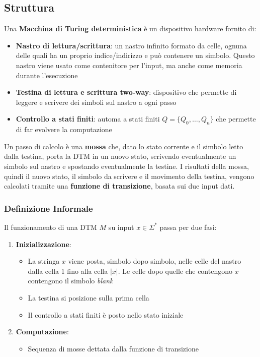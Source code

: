 \subsection{Struttura}

Una \textbf{Macchina di Turing deterministica} è un dispositivo hardware fornito di:
\begin{itemize}
	\item \textbf{Nastro di lettura/scrittura}: un nastro infinito formato da celle, ognuna delle quali ha un proprio indice/indirizzo e può contenere un simbolo. Questo nastro viene usato come contenitore per l'input, ma anche come memoria durante l'esecuzione
    
	\item \textbf{Testina di lettura e scrittura two-way}: dispositivo che permette di leggere e scrivere dei simboli sul nastro a ogni passo
    
	\item \textbf{Controllo a stati finiti}: automa a stati finiti $Q = \{Q_0, \dots, Q_n\}$ che permette di far evolvere la computazione
\end{itemize}

Un passo di calcolo è una \textbf{mossa} che, dato lo stato corrente e il simbolo letto dalla testina, porta la DTM in un nuovo stato, scrivendo eventualmente un simbolo sul nastro e spostando eventualmente la testine. I risultati della mossa, quindi il nuovo stato, il simbolo da scrivere e il movimento della testina, vengono calcolati tramite una \textbf{funzione di transizione}, basata sui due input dati.

\subsubsection{Definizione Informale}

Il funzionamento di una DTM $M$ su input $x \in \Sigma^\ast$ passa per due fasi:
\begin{enumerate}
	\item \textbf{Inizializzazione}:
	\begin{itemize}
		\item La stringa $x$ viene posta, simbolo dopo simbolo, nelle celle del nastro dalla cella 1 fino alla cella $|x|$. Le celle dopo quelle che contengono $x$ contengono il simbolo \textit{blank}
		
        \item La testina si posizione sulla prima cella
		
        \item Il controllo a stati finiti è posto nello stato iniziale
	\end{itemize}
	
    \item \textbf{Computazione}:
	\begin{itemize}
		\item Sequenza di mosse dettata dalla funzione di transizione
	\end{itemize}
\end{enumerate}

